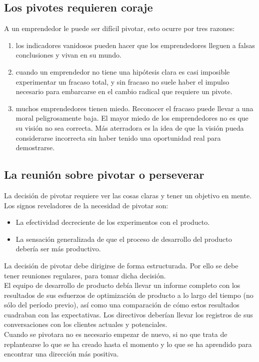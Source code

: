 \documentclass[10pt]{article}
\begin{document}
\begin{multicols}{2}
\subsection*{Los pivotes requieren coraje}
A un emprendedor le puede ser difícil pivotar, esto ocurre por tres razones:
\begin{enumerate}[\bfseries 1.]
\item  los indicadores vanidosos pueden hacer que los emprendedores lleguen a falsas conclusiones y vivan en su mundo.
\item cuando un emprendedor no tiene una hipótesis clara es casi imposible experimentar un fracaso total, y sin fracaso no suele haber el impulso necesario para embarcarse en el cambio radical que requiere un pivote.
\item muchos emprendedores tienen miedo. Reconocer el fracaso puede llevar a una moral peligrosamente baja. El mayor miedo de los emprendedores no es que su visión no sea correcta. Más aterradora es la idea de que la visión pueda considerarse incorrecta sin haber tenido una oportunidad real para demostrarse.
\end{enumerate}
\subsection*{La reunión sobre pivotar o perseverar}
La decisión de pivotar requiere ver las cosas claras y tener un objetivo en mente. \\
Los signos reveladores de la necesidad de pivotar son:
\begin{itemize}
\item La efectividad decreciente de los experimentos con el producto.
\item La sensación
generalizada de que el proceso de desarrollo del producto debería ser más productivo.
\end{itemize}
La decisión de pivotar debe dirigirse de forma estructurada. Por ello se debe tener reuniones regulares, para tomar dicha decisión.\\
{\color{blue}El equipo de desarrollo de producto debía llevar un informe completo con los resultados de sus esfuerzos de optimización de producto a lo largo del tiempo (no sólo del período previo), así como una comparación de cómo estos resultados cuadraban con las expectativas. Los directivos deberían llevar los registros de sus conversaciones con los clientes actuales y potenciales.}\\
Cuando se pivotara no es necesario empezar de nuevo, si no que trata de replantearse lo que se ha creado hasta el momento y lo que se ha aprendido para encontrar una dirección más positiva.

\end{multicols}
\end{document}
